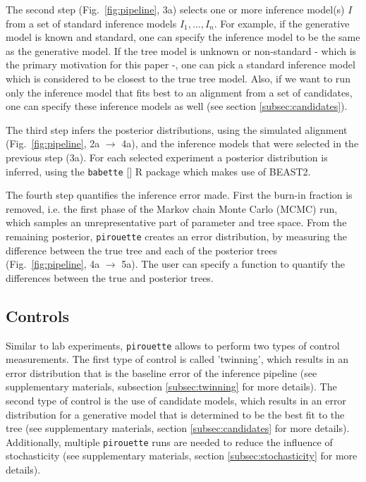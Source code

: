 The second step (Fig.~\ref{fig:pipeline}, 3a)
selects one or more inference model(s) $I$ from 
a set of standard inference models $I_{1},\dots,I_{n}$.
For example, if the generative model is known and standard,
one can specify the inference model to be the same as the generative model.
If the tree model is unknown or non-standard - which is the primary 
motivation for this paper -, one can pick
a standard inference model which is considered 
to be closest to the true tree model.
Also, if we want to run only the inference
model that fits best to an alignment from a set of candidates,
one can specify these inference models as 
well (see section \ref{subsec:candidates}).

The third step infers the posterior distributions,
using the simulated alignment (Fig.~\ref{fig:pipeline}, 2a $\rightarrow$ 4a),
and the inference models that were selected in the previous step (3a). 
For each selected experiment a posterior distribution is inferred, using the 
\verb;babette; [\cite{bilderbeek2018babette}] R package which makes use of BEAST2. 

The fourth step quantifies the inference error made. 
First the burn-in fraction is removed, i.e. the first phase of the 
Markov chain Monte Carlo (MCMC) run,
which samples an unrepresentative part of parameter and tree space. 
From the remaining posterior, \verb;pirouette; 
creates an error distribution, by measuring the difference
between the true tree and each of the posterior 
trees (Fig.~\ref{fig:pipeline}, 4a $\rightarrow$ 5a).
The user can specify a function to quantify the differences between
the true and posterior trees. 

\subsection{Controls}\label{subsec:controls}

Similar to lab experiments, \verb;pirouette; allows to perform
two types of control measurements. The first type of control
is called 'twinning', which results in an error distribution
that is the baseline error of the inference pipeline (see
supplementary materials, subsection \ref{subsec:twinning} for more details).
The second type of control is the use of candidate models,
which results in an error distribution
for a generative model that is determined to be the best fit to
the tree (see supplementary materials, 
section \ref{subsec:candidates} for more details).
Additionally, multiple \verb;pirouette; runs are needed
to reduce the influence of stochasticity (see supplementary materials, 
section \ref{subsec:stochasticity} for more details).

